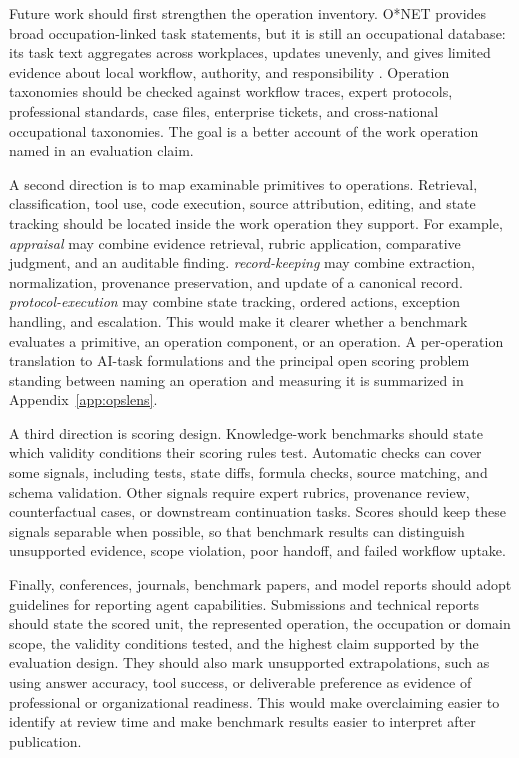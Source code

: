 \documentclass{article}
\begin{document}
Future work should first strengthen the operation inventory.
O{*}NET provides broad occupation-linked task statements, but it is still an occupational database: its task text aggregates across workplaces, updates unevenly, and gives limited evidence about local workflow, authority, and responsibility \citep{handel2016onet}.
Operation taxonomies should be checked against workflow traces, expert protocols, professional standards, case files, enterprise tickets, and cross-national occupational taxonomies.
The goal is a better account of the work operation named in an evaluation claim.

A second direction is to map examinable primitives to operations.
Retrieval, classification, tool use, code execution, source attribution, editing, and state tracking should be located inside the work operation they support.
For example, \emph{appraisal} may combine evidence retrieval, rubric application, comparative judgment, and an auditable finding.
\emph{record-keeping} may combine extraction, normalization, provenance preservation, and update of a canonical record.
\emph{protocol-execution} may combine state tracking, ordered actions, exception handling, and escalation.
This would make it clearer whether a benchmark evaluates a primitive, an operation component, or an operation.
A per-operation translation to AI-task formulations and the principal open scoring problem standing between naming an operation and measuring it is summarized in Appendix~\ref{app:opslens}.

A third direction is scoring design.
Knowledge-work benchmarks should state which validity conditions their scoring rules test.
Automatic checks can cover some signals, including tests, state diffs, formula checks, source matching, and schema validation.
Other signals require expert rubrics, provenance review, counterfactual cases, or downstream continuation tasks.
Scores should keep these signals separable when possible, so that benchmark results can distinguish unsupported evidence, scope violation, poor handoff, and failed workflow uptake.

Finally, conferences, journals, benchmark papers, and model reports should adopt guidelines for reporting agent capabilities.
Submissions and technical reports should state the scored unit, the represented operation, the occupation or domain scope, the validity conditions tested, and the highest claim supported by the evaluation design.
They should also mark unsupported extrapolations, such as using answer accuracy, tool success, or deliverable preference as evidence of professional or organizational readiness.
This would make overclaiming easier to identify at review time and make benchmark results easier to interpret after publication.
\end{document}
